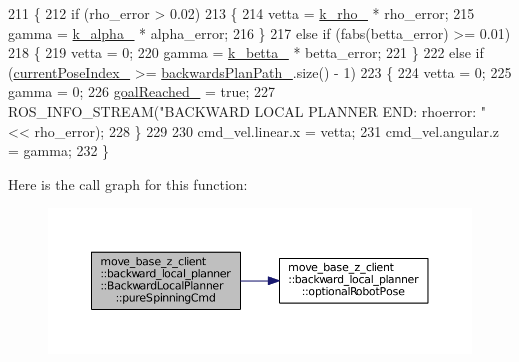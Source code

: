 \begin{DoxyCode}
211 \{
212     \textcolor{keywordflow}{if} (rho\_error > 0.02)
213     \{
214         vetta = \hyperlink{classmove__base__z__client_1_1backward__local__planner_1_1BackwardLocalPlanner_a9ae9a8c4c4663a999ba107aea9f6868d}{k\_rho\_} * rho\_error;
215         gamma = \hyperlink{classmove__base__z__client_1_1backward__local__planner_1_1BackwardLocalPlanner_ac859500c0329247de08daf864fd2d4b1}{k\_alpha\_} * alpha\_error;
216     \}
217     \textcolor{keywordflow}{else} \textcolor{keywordflow}{if} (fabs(betta\_error) >= 0.01)
218     \{
219         vetta = 0;
220         gamma = \hyperlink{classmove__base__z__client_1_1backward__local__planner_1_1BackwardLocalPlanner_aa2f7fe022cdc4eb11c17f6f576c732c6}{k\_betta\_} * betta\_error;
221     \}
222     \textcolor{keywordflow}{else} \textcolor{keywordflow}{if} (\hyperlink{classmove__base__z__client_1_1backward__local__planner_1_1BackwardLocalPlanner_af304b2e7cde744ad905a1ae7889102b6}{currentPoseIndex\_} >= \hyperlink{classmove__base__z__client_1_1backward__local__planner_1_1BackwardLocalPlanner_a451add2af7d6d83a7415277311b3ed04}{backwardsPlanPath\_}.size() - 1)
223     \{
224         vetta = 0;
225         gamma = 0;
226         \hyperlink{classmove__base__z__client_1_1backward__local__planner_1_1BackwardLocalPlanner_a0a89141d3d3a8ebfb9e1d69d0d33fd49}{goalReached\_} = \textcolor{keyword}{true};
227         ROS\_INFO\_STREAM(\textcolor{stringliteral}{"BACKWARD LOCAL PLANNER END: rhoerror: "} << rho\_error);
228     \}
229 
230     cmd\_vel.linear.x = vetta;
231     cmd\_vel.angular.z = gamma;
232 \}
\end{DoxyCode}


Here is the call graph for this function\+:
\nopagebreak
\begin{figure}[H]
\begin{center}
\leavevmode
\includegraphics[width=350pt]{classmove__base__z__client_1_1backward__local__planner_1_1BackwardLocalPlanner_a3b08865dc8e19750273d971336ecba3b_cgraph}
\end{center}
\end{figure}




